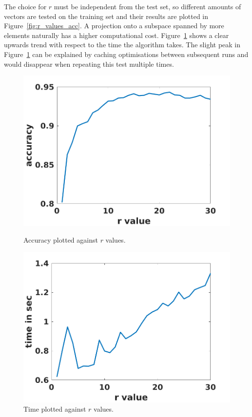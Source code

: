 The choice for \(r\) must be independent from the test set, so different amounts of vectors are tested on the training set and their results are plotted in Figure~\ref{fig:r_values_acc}.
A projection onto a subspace spanned by more elements naturally has a higher computational cost.
Figure~\ref{fig:r_values_time} shows a clear upwards trend with respect to the time the algorithm takes.
The slight peak in Figure~\ref{fig:r_values_time} can be explained by caching optimisations between subsequent runs and would disappear when repeating this test multiple times.

\begin{figure}[H]
    \centering
    \begin{minipage}{0.45\textwidth}
        \includegraphics[width = \textwidth]{images/svd/r_values.png}
        \caption{Accuracy plotted against \(r\) values.}\label{fig:r_values_acc}
    \end{minipage}
    \begin{minipage}{0.45\textwidth}
        \includegraphics[width = \textwidth]{images/svd/time.png}
        \caption{Time plotted against \(r\) values.}\label{fig:r_values_time}
    \end{minipage}
\end{figure}

